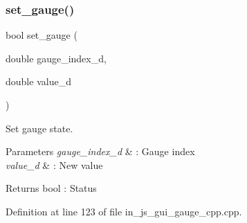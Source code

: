 \mbox{\label{group___gauge_ga34109c01880fe7fe2c117e56de4d8f39}} 
\subsubsection{set\_gauge()}
{\footnotesize\ttfamily bool set\+\_\+gauge (\begin{DoxyParamCaption}\item[{double}]{gauge\+\_\+index\+\_\+d,  }\item[{double}]{value\+\_\+d }\end{DoxyParamCaption})}



Set gauge state. 


\begin{DoxyParams}{Parameters}
{\em gauge\+\_\+index\+\_\+d} & \+: Gauge index \\
\hline
{\em value\+\_\+d} & \+: New value \\
\hline
\end{DoxyParams}
\begin{DoxyReturn}{Returns}
bool \+: Status 
\end{DoxyReturn}


Definition at line 123 of file in\+\_\+js\+\_\+gui\+\_\+gauge\+\_\+cpp.\+cpp.


